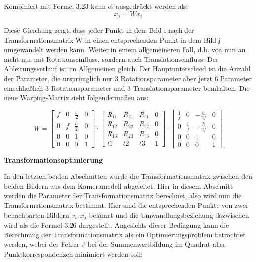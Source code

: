 Kombiniert mit Formel 3.23 kann es ausgedrückt werden als:
\begin{equation}
   x_j = Wx_i
\end{equation}

Diese Gleichung zeigt, dass jeder Punkt in dem Bild i nach der Transformationsmatrix W in einen entsprechenden Punkt in dem Bild j umgewandelt werden kann. Weiter in einem allgemeineren Fall, d.h. von nun an nicht nur mit Rotationseinfluss, sondern auch Translationseinfluss. Der Ableitungsverlauf ist im Allgemeinen gleich. Der Hauptunterschied ist die Anzahl der Parameter, die ursprünglich nur 3 Rotationsparameter aber jetzt 6 Parameter einschließlich 3 Rotationsparameter und 3 Translationsparameter beinhalten. Die neue Warping-Matrix sieht folgendermaßen aus:

\begin{equation}
   W = \begin{bmatrix}
	f			& 0 		& \frac{w}{2}	  & 0 \\
	0	 		& f			& \frac{h}{2} 	  & 0 \\
	0     		& 0 		& 1 			  & 0 \\	
	0     		& 0 		& 0 			  & 1
	\end{bmatrix} \cdot \begin{bmatrix}
	R_{11}			& R_{21}  		& R_{31}	  & 0 \\
	R_{12}	 		& R_{22}		& R_{32}	  & 0 \\
	R_{13}     		& R_{23} 		& R_{33} 	  & 0 \\	
	t1     			& t2 			& t3 		  & 1
	\end{bmatrix} \cdot \begin{bmatrix}
	\frac{1}{f}	   & 0 				& -\frac{w}{2f}	  & 0 \\
	0	 		   & \frac{1}{f}	& -\frac{h}{2f}   & 0 \\
	0     		   & 0 		        & 1 			  & 0 \\	
	0     		   & 0 		        & 0 			  & 1
	\end{bmatrix}
\end{equation}

\textbf{Transformationsoptimierung}

In den letzten beiden Abschnitten wurde die Transformationsmatrix zwischen den beiden Bildern aus dem Kameramodell abgeleitet. Hier in diesem Abschnitt werden die Parameter der Transformationsmatrix berechnet, also wird nun die Transformationsmatrix bestimmt. Hier sind die entsprechenden Punkte von zwei benachbarten Bildern $x_i, x_j$ bekannt und die Umwandlungsbeziehung dazwischen wird als die Formel 3.26 dargestellt. Angesichts dieser Bedingung 
kann die Berechnung der Transformationsmatrix als ein Optimierungsproblem betrachtet werden, wobei der Fehler J bei der Summenwertbildung im Quadrat aller Punktkorrespondenzen minimiert werden soll:

